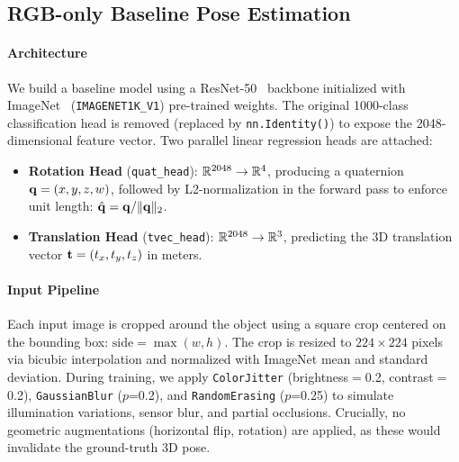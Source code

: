\subsection{RGB-only Baseline Pose Estimation}
\label{sec:method_baseline}

\paragraph{Architecture}
We build a baseline model using a ResNet-50~\cite{he2016deep} backbone initialized with ImageNet~\cite{deng2009imagenet} (\texttt{IMAGENET1K\_V1}) pre-trained weights. The original 1000-class classification head is removed (replaced by \texttt{nn.Identity()}) to expose the 2048-dimensional feature vector. Two parallel linear regression heads are attached:

\begin{itemize}
    \item \textbf{Rotation Head} (\texttt{quat\_head}): $\mathbb{R}^{2048} \rightarrow \mathbb{R}^{4}$, producing a quaternion $\mathbf{q} = (x, y, z, w)$, followed by L2-normalization in the forward pass to enforce unit length: $\hat{\mathbf{q}} = \mathbf{q} / \|\mathbf{q}\|_2$.
    \item \textbf{Translation Head} (\texttt{tvec\_head}): $\mathbb{R}^{2048} \rightarrow \mathbb{R}^{3}$, predicting the 3D translation vector $\mathbf{t} = (t_x, t_y, t_z)$ in meters.
\end{itemize}

\paragraph{Input Pipeline}
Each input image is cropped around the object using a square crop centered on the bounding box: $\text{side} = \max(w, h)$. The crop is resized to $224 \times 224$ pixels via bicubic interpolation and normalized with ImageNet mean and standard deviation. During training, we apply \texttt{ColorJitter} (brightness$=$0.2, contrast$=$0.2), \texttt{GaussianBlur} ($p$=0.2), and \texttt{RandomErasing} ($p$=0.25) to simulate illumination variations, sensor blur, and partial occlusions. Crucially, no geometric augmentations (horizontal flip, rotation) are applied, as these would invalidate the ground-truth 3D pose.

